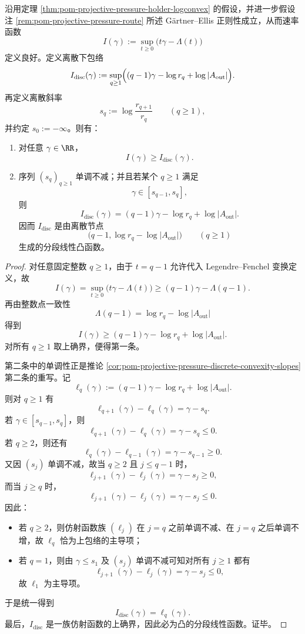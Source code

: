 \begin{theorem}\label{thm:pom-projective-pressure-discrete-legendre-envelope}
沿用定理 \ref{thm:pom-projective-pressure-holder-logconvex} 的假设，并进一步假设注 \ref{rem:pom-projective-pressure-route} 所述 G\"artner--Ellis 正则性成立，从而速率函数
\[
I(\gamma):=\sup_{t\ge 0}\bigl(t\gamma-\Lambda(t)\bigr)
\]
定义良好。定义离散下包络
\[
I_{\mathrm{disc}}(\gamma)
:=
\sup_{q\ge 1}
\Bigl((q-1)\gamma-\log r_q+\log|A_{\mathrm{out}}|\Bigr).
\]
再定义离散斜率
\[
s_q:=\log\frac{r_{q+1}}{r_q}
\qquad(q\ge 1),
\]
并约定 \(s_0:=-\infty\)。则有：
\begin{enumerate}
  \item 对任意 \(\gamma\in\RR\)，
  \[
  \boxed{\;I(\gamma)\ge I_{\mathrm{disc}}(\gamma).\;}
  \]
  \item 序列 \((s_q)_{q\ge 1}\) 单调不减；并且若某个 \(q\ge 1\) 满足
  \[
  \gamma\in[s_{q-1},s_q],
  \]
  则
  \[
  \boxed{\;
  I_{\mathrm{disc}}(\gamma)
  =
  (q-1)\gamma-\log r_q+\log|A_{\mathrm{out}}|.\;}
  \]
  因而 \(I_{\mathrm{disc}}\) 是由离散节点
  \[
  \bigl(q-1,\log r_q-\log|A_{\mathrm{out}}|\bigr)
  \qquad(q\ge 1)
  \]
  生成的分段线性凸函数。
\end{enumerate}
\end{theorem}
\begin{proof}
对任意固定整数 \(q\ge 1\)，由于 \(t=q-1\) 允许代入 Legendre--Fenchel 变换定义，故
\[
I(\gamma)
=
\sup_{t\ge 0}\bigl(t\gamma-\Lambda(t)\bigr)
\ge
(q-1)\gamma-\Lambda(q-1).
\]
再由整数点一致性
\[
\Lambda(q-1)=\log r_q-\log|A_{\mathrm{out}}|
\]
得到
\[
I(\gamma)\ge (q-1)\gamma-\log r_q+\log|A_{\mathrm{out}}|.
\]
对所有 \(q\ge 1\) 取上确界，便得第一条。

第二条中的单调性正是推论 \ref{cor:pom-projective-pressure-discrete-convexity-slopes} 第二条的重写。记
\[
\ell_q(\gamma):=(q-1)\gamma-\log r_q+\log|A_{\mathrm{out}}|.
\]
则对 \(q\ge 1\) 有
\[
\ell_{q+1}(\gamma)-\ell_q(\gamma)=\gamma-s_q.
\]
若 \(\gamma\in[s_{q-1},s_q]\)，则
\[
\ell_{q+1}(\gamma)-\ell_q(\gamma)=\gamma-s_q\le 0.
\]
\(\text{若 }q\ge 2\)，则还有
\[
\ell_q(\gamma)-\ell_{q-1}(\gamma)=\gamma-s_{q-1}\ge 0.
\]
又因 \((s_j)\) 单调不减，故当 \(q\ge 2\) 且 \(j\le q-1\) 时，
\[
\ell_{j+1}(\gamma)-\ell_j(\gamma)=\gamma-s_j\ge 0,
\]
而当 \(j\ge q\) 时，
\[
\ell_{j+1}(\gamma)-\ell_j(\gamma)=\gamma-s_j\le 0.
\]
因此：
\begin{itemize}
\item 若 \(q\ge 2\)，则仿射函数族 \((\ell_j)\) 在 \(j=q\) 之前单调不减、在 \(j=q\) 之后单调不增，故 \(\ell_q\) 恰为上包络的主导项；
\item 若 \(q=1\)，则由 \(\gamma\le s_1\) 及 \((s_j)\) 单调不减可知对所有 \(j\ge 1\) 都有
\[
\ell_{j+1}(\gamma)-\ell_j(\gamma)=\gamma-s_j\le 0,
\]
故 \(\ell_1\) 为主导项。
\end{itemize}
于是统一得到
\[
I_{\mathrm{disc}}(\gamma)=\ell_q(\gamma).
\]
最后，\(I_{\mathrm{disc}}\) 是一族仿射函数的上确界，因此必为凸的分段线性函数。证毕。
\end{proof}

